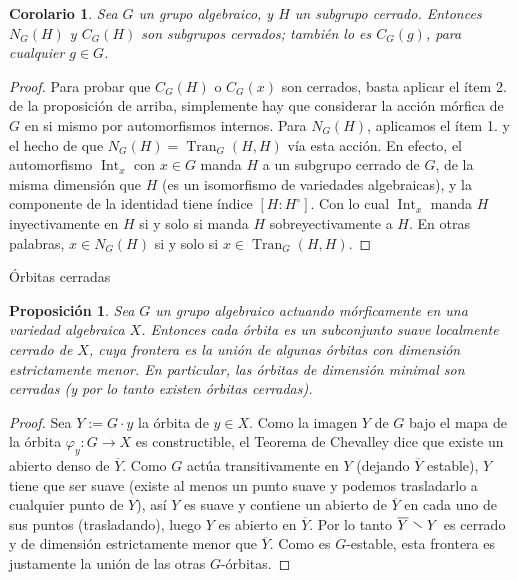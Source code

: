 \documentclass[spanish,12pt]{amsart}
\makeatletter
\renewcommand\subsection{\@startsection{subsection}{2}%
  \z@{.5\linespacing\@plus.7\linespacing}{-.5em}%
  {\normalfont\sffamily}}
\newtheorem{corollary}[theorem]{Corolario}
\newtheorem{proposition}[theorem]{Proposición}
\theoremstyle{definition}
\theoremstyle{remark}
\numberwithin{equation}{section}
\renewcommand{\setminus}{\mathrel{\stackon[0.5pt]{}{$\smallsetminus$}}}
\renewcommand{\bar}[1]{\overline{#1}}
\makeatother
\begin{document}
\begin{corollary}
Sea $G$ un grupo algebraico, y $H$ un subgrupo cerrado. Entonces $N_G (H)$ y $C_G (H)$ son subgrupos cerrados; también lo es $C_G (g)$, para cualquier $g \in G$.
\end{corollary}
\begin{proof}
Para probar que $C_G (H)$ o $C_G (x)$ son cerrados, basta aplicar el ítem 2. de la proposición de arriba, simplemente hay que considerar la acción mórfica de $G$ en si mismo por automorfismos internos. Para $N_G (H)$, aplicamos el ítem 1. y el hecho de que $N_G (H) = \operatorname{Tran}_G (H,H)$ vía esta acción. En efecto, el automorfismo $\operatorname{Int}_x$ con $x \in G$ manda $H$ a un subgrupo cerrado de $G$, de la misma dimensión que $H$ (es un isomorfismo de variedades algebraicas), y la componente de la identidad tiene índice $[H : H^\circ]$. Con lo cual $\operatorname{Int}_x$ manda $H$ inyectivamente en $H$ si y solo si manda $H$ sobreyectivamente a $H$. En otras palabras, $x \in N_G (H)$ si y solo si $x \in \operatorname {Tran}_G (H, H)$.
\end{proof}



\subsection{Órbitas cerradas}

\begin{proposition}\label{proposition:orbita cerrada}
Sea $G$ un grupo algebraico actuando mórficamente en una variedad algebraica $X$. Entonces cada órbita es un subconjunto suave localmente cerrado de $X$, cuya frontera es la unión de algunas órbitas con dimensión estrictamente menor. En particular, las órbitas de dimensión minimal son cerradas (y por lo tanto existen órbitas cerradas).
\end{proposition}

\begin{proof}
Sea $Y := G \cdot y$ la órbita de $y \in X$. Como la imagen $Y$ de $G$ bajo el mapa de la órbita $\varphi_y : G \to X$ es constructible, el Teorema de Chevalley dice que existe un abierto denso de $\bar Y$. Como $G$ actúa transitivamente en $Y$ (dejando $\bar Y$ estable), $Y$ tiene que ser suave (existe al menos un punto suave y podemos trasladarlo a cualquier punto de $Y$), así $Y$ es suave y contiene un abierto de $\bar Y$ en cada uno de sus puntos (trasladando), luego $Y$ es abierto en $\bar Y$. Por lo tanto $\bar Y \setminus Y$ es cerrado y de dimensión estrictamente menor que $\bar Y$. Como es $G$-estable, esta frontera es justamente la unión de las otras $G$-órbitas.
\end{proof}
\end{document}
